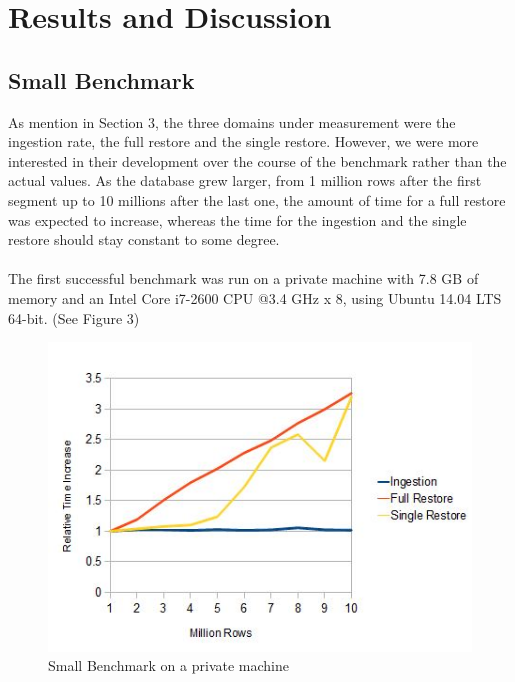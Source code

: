 \documentclass[11pt,singlecolumn]{scrartcl}
\begin{document}
\clearpage


\section{Results and Discussion}
\subsection{Small Benchmark}As mention in Section 3, the three domains under measurement were the ingestion rate, the full restore and the single restore. However, we were more interested in their development over the course of the benchmark rather than the actual values. As the database grew larger, from 1 million rows after the first segment up to 10 millions after the last one, the amount of time for a full restore was expected to increase, whereas the time for the ingestion and the single restore should stay constant to some degree.\\\\The first successful benchmark was run on a private machine with 7.8 GB of memory and an Intel Core i7-2600 CPU @3.4 GHz x 8, using Ubuntu 14.04 LTS 64-bit. (See Figure 3)

\begin{figure}[h]
\includegraphics[scale=1.1]{loc.jpg}
\caption{Small Benchmark on a private machine}
\end{figure}
\end{document}

